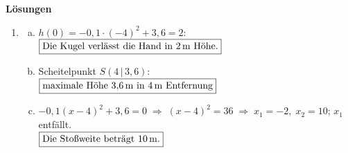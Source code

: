 	\newpage

	\begin{center}\textbf{\Large{Lösungen}}\end{center}
	\medskip
	\begin{scriptsize}\begin{enumerate}[(1)]
		\item
			\begin{minipage}[t]{0.60\linewidth}
				\vspace{0pt}\raggedright
				\begin{enumerate}[(a)]
					\item $h(0)=-0{,}1\cdot(-4)^2+3{,}6=2$:\\ $\boxed{\text{Die Kugel verlässt die Hand in } \unit[2]{m} \text{ Höhe.}}$
					\item Scheitelpunkt $S(4\,|\,3{,}6)$:\\ $\boxed{\text{maximale Höhe } \unit[3{,}6]{m} \text{ in } \unit[4]{m} \text{ Entfernung}}$
					\item $-0{,}1(x-4)^2+3{,}6=0 \;\Rightarrow\; (x-4)^2=36 \;\Rightarrow\; x_1=-2,\; x_2=10$; \;$x_1$ entfällt.\\
						$\boxed{\text{Die Stoßweite beträgt } \unit[10]{m}.}$
				\end{enumerate}
			\end{minipage}\hfill
			\begin{minipage}[t]{0.38\linewidth}
				\vspace{0pt}\centering
				\resizebox{\linewidth}{!}{{\mitKStrue \skizzeKugelstoss}}
			\end{minipage}
	\end{enumerate}\end{scriptsize}


